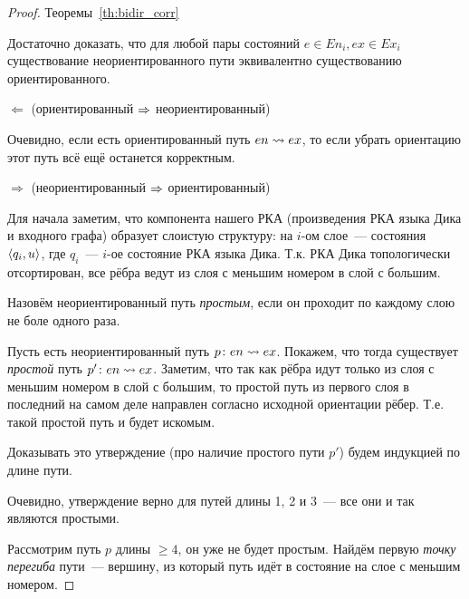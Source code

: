 \begin{proof}{Теоремы~\ref{th:bidir_corr}}

  Достаточно доказать, что для любой пары состояний $e \in En_i, ex \in Ex_i$ существование неориентированного пути эквивалентно существованию ориентированного.

  $\Leftarrow$ (ориентированный $\Rightarrow$ неориентированный)

  Очевидно, если есть ориентированный путь $en \rightsquigarrow ex$, то если убрать ориентацию этот путь всё ещё останется корректным.

  $\Rightarrow$ (неориентированный $\Rightarrow$ ориентированный)

  Для начала заметим, что компонента нашего РКА (произведения РКА языка Дика и входного графа) образует слоистую структуру: на $i$-ом слое~--- состояния $\langle q_i, u \rangle$, где $q_i$~--- $i$-ое состояние РКА языка Дика. Т.к. РКА Дика топологически отсортирован, все рёбра ведут из слоя с меньшим номером в слой с большим.


  Назовём неориентированный путь \textit{простым}, если он проходит по каждому слою не боле одного раза.

  Пусть есть неориентированный путь $p \colon en \rightsquigarrow ex$. Покажем, что тогда существует \textit{простой} путь $p' \colon en \rightsquigarrow ex$. Заметим, что так как рёбра идут только из слоя с меньшим номером в слой с большим, то простой путь из первого слоя в последний на самом деле направлен согласно исходной ориентации рёбер. Т.е. такой простой путь и будет искомым.

  Доказывать это утверждение (про наличие простого пути $p'$) будем индукцией по длине пути.



  Очевидно, утверждение верно для путей длины 1, 2 и 3~--- все они и так являются простыми.

  Рассмотрим путь $p$ длины $\ge 4$, он уже не будет простым. Найдём первую \textit{точку перегиба} пути~--- вершину, из который путь идёт в состояние на слое с меньшим номером.


\end{proof}
